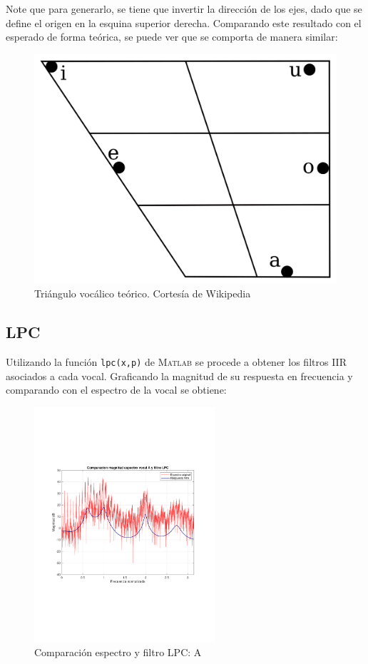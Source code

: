 	Note que para generarlo, se tiene que invertir la dirección de los ejes, dado que se define el origen en la esquina superior derecha. Comparando este resultado con el esperado de forma teórica, se puede ver que se comporta de manera similar:
	\begin{figure}[H]
		\center
		\includegraphics[width = 0.6\linewidth]{../plots/1280px-Spanish_vowel_chart.png}
		\caption{Triángulo vocálico teórico. Cortesía de Wikipedia}
		\label{fig:triang_vocal_teorico}
	\end{figure}
	
	
	\subsection{LPC}
		Utilizando la función \texttt{lpc(x,p)} de \textsc{Matlab} se procede a obtener los filtros IIR asociados a cada vocal. Graficando la magnitud de su respuesta en frecuencia y comparando con el espectro de la vocal se obtiene:
		
	
	\begin{figure}[H]
		\center
		\includegraphics[width=0.6\textwidth,clip, trim = {1.9cm 6.8cm 2.3cm 7cm}]{../plots/A_lpc.pdf}
		\caption{Comparación espectro y filtro LPC: A}
		\label{fig:LPC_A}
	\end{figure}

